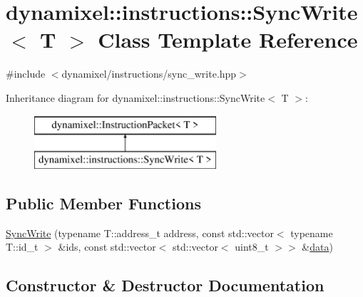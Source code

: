 \hypertarget{classdynamixel_1_1instructions_1_1_sync_write}{}\section{dynamixel\+:\+:instructions\+:\+:Sync\+Write$<$ T $>$ Class Template Reference}
\label{classdynamixel_1_1instructions_1_1_sync_write}


{\ttfamily \#include $<$dynamixel/instructions/sync\+\_\+write.\+hpp$>$}

Inheritance diagram for dynamixel\+:\+:instructions\+:\+:Sync\+Write$<$ T $>$\+:\begin{figure}[H]
\begin{center}
\leavevmode
\includegraphics[height=2.000000cm]{classdynamixel_1_1instructions_1_1_sync_write}
\end{center}
\end{figure}
\subsection*{Public Member Functions}
\begin{DoxyCompactItemize}
\item 
\hyperlink{classdynamixel_1_1instructions_1_1_sync_write_abdc2dccf51359a99809088bc128da91b}{Sync\+Write} (typename T\+::address\+\_\+t address, const std\+::vector$<$ typename T\+::id\+\_\+t $>$ \&ids, const std\+::vector$<$ std\+::vector$<$ uint8\+\_\+t $>$$>$ \&\hyperlink{classdynamixel_1_1_instruction_packet_a9a642ac2e80dc38172166b0508101bb8}{data})
\end{DoxyCompactItemize}


\subsection{Constructor \& Destructor Documentation}
\hypertarget{classdynamixel_1_1instructions_1_1_sync_write_abdc2dccf51359a99809088bc128da91b}{}
